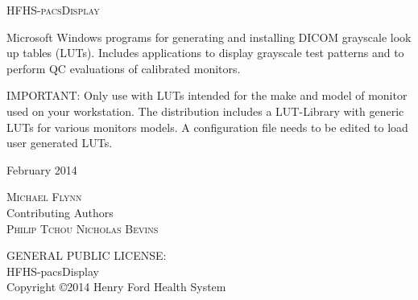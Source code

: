 \begin{titlepage}
\begin{center}

\vspace*{10 em}

\textsc{\Huge HFHS-pacsDisplay}

\vspace{2 em}
\HRule
\vspace{1 em}

\begin{minipage}{0.75\textwidth}
\normalsize{Microsoft Windows programs for generating and installing DICOM grayscale look up tables (LUTs). Includes applications to display grayscale test patterns and to perform QC evaluations of calibrated monitors.}
\end{minipage}

\vspace{2 em}

\begin{minipage}{0.75\textwidth}
\normalsize{IMPORTANT: Only use with LUTs intended for the make and model of monitor used on your workstation. The distribution includes a LUT-Library with generic LUTs for various monitors models. A configuration file needs to be edited to load user generated LUTs.}
\end{minipage}

\vspace{1 em}
\HRule
\vspace{1 em}
{\large February 2014}\\

\vfill

\textsc{\Large Michael Flynn}\\
\vspace{1 em}
\normalsize{Contributing Authors}\\
\vspace{0.5 em}
\textsc{
Philip Tchou \qquad Nicholas Bevins
}


\clearpage

\vspace*{5 em}

\begin{minipage}{0.75\textwidth}
\begin{center}
\normalsize{GENERAL PUBLIC LICENSE:\\
HFHS-pacsDisplay\\
Copyright \copyright 2014  Henry Ford Health System}
\end{center}
\end{minipage}


\end{center}
\end{titlepage}
